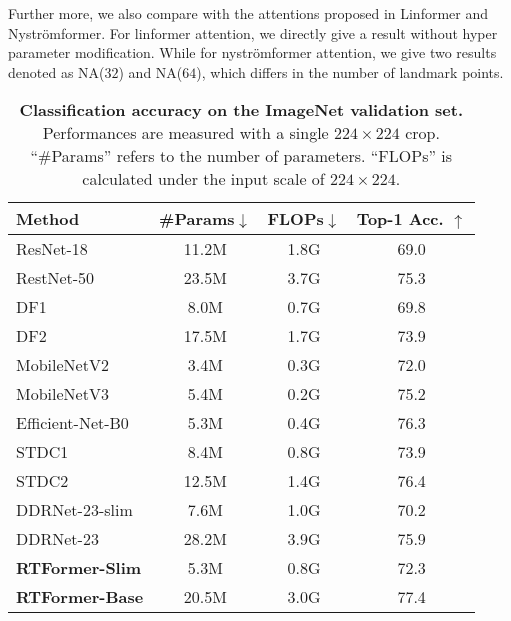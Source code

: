 \documentclass{article}
\begin{document}
Further more, we also compare with the attentions proposed in Linformer \cite{wang2020linformer} and Nystr{\"o}mformer\cite{xiong2021nystromformer}. For linformer attention, we directly give a result without hyper parameter modification. While for nystr{\"o}mformer attention, we give two results denoted as NA($32$) and NA($64$), which differs in the number of landmark points.

\begin{table}[t]
\centering
\caption{\textbf{Classification accuracy on the ImageNet validation set.} Performances are measured with a single $224\times224$ crop. ``\#Params'' refers to the number of parameters. ``FLOPs'' is calculated under the input scale of $224\times 224$.}
\begin{tabular}{l|c|c|c}
\toprule
Method & \#Params$\downarrow$ & FLOPs$\downarrow$ & Top-1 Acc. $\uparrow$\\
\midrule
ResNet-18\cite{he2016deep} & 11.2M & 1.8G & 69.0 \\
RestNet-50\cite{he2016deep} & 23.5M & 3.7G & 75.3 \\
DF1\cite{li2019partial} & 8.0M & 0.7G & 69.8 \\
DF2\cite{li2019partial} & 17.5M & 1.7G & 73.9 \\
MobileNetV2\cite{sandler2018mobilenetv2} & 3.4M & 0.3G & 72.0 \\
MobileNetV3\cite{howard2019searching} & 5.4M & 0.2G & 75.2 \\
Efficient-Net-B0\cite{tan2019efficientnet} & 5.3M & 0.4G & 76.3 \\
STDC1\cite{fan2021rethinking} & 8.4M & 0.8G & 73.9 \\
STDC2\cite{fan2021rethinking} & 12.5M & 1.4G & 76.4 \\
\midrule
DDRNet-23-slim\cite{hong2021deep} & 7.6M & 1.0G & 70.2 \\
DDRNet-23\cite{hong2021deep} & 28.2M & 3.9G & 75.9 \\
\midrule
\textbf{RTFormer-Slim} & 5.3M & 0.8G & 72.3 \\
\textbf{RTFormer-Base} & 20.5M & 3.0G & 77.4 \\
\bottomrule
\end{tabular}
\label{supp-tab:imagenet-result}
\end{table}
\end{document}
